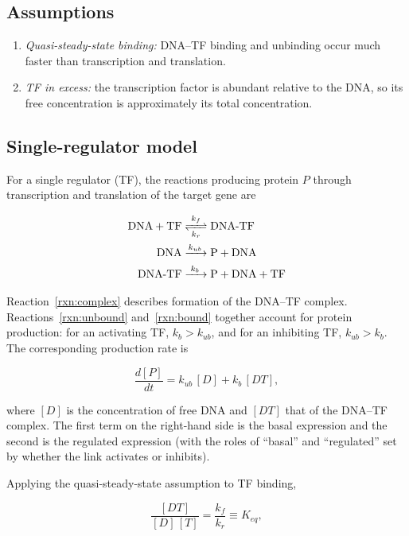 \documentclass[11pt]{article}
\begin{document}
\subsection{Assumptions}

\begin{enumerate}
    \item \emph{Quasi-steady-state binding:} DNA--TF binding and unbinding occur
    much faster than transcription and translation.
    \item \emph{TF in excess:} the transcription factor is abundant relative to
    the DNA, so its free concentration is approximately its total concentration.
\end{enumerate}

\subsection{Single-regulator model}

For a single regulator (TF), the reactions producing protein $P$ through
transcription and translation of the target gene are

\begin{align}
    \ce{DNA + TF &<=>[$k_f$][$k_r$] DNA{-}TF} \label{rxn:complex} \\
    \ce{DNA &->[$k_{ub}$] P + DNA} \label{rxn:unbound} \\
    \ce{DNA{-}TF &->[$k_{b}$] P + DNA + TF} \label{rxn:bound}
\end{align}

Reaction~\eqref{rxn:complex} describes formation of the DNA--TF complex.
Reactions~\eqref{rxn:unbound} and~\eqref{rxn:bound} together account for protein
production: for an activating TF, $k_b > k_{ub}$, and for an inhibiting TF,
$k_{ub} > k_b$. The corresponding production rate is

\begin{equation}
    \frac{d[P]}{dt} = k_{ub}\,[D] + k_{b}\,[DT],
    \label{eq:rate}
\end{equation}

where $[D]$ is the concentration of free DNA and $[DT]$ that of the DNA--TF
complex. The first term on the right-hand side is the basal expression and the
second is the regulated expression (with the roles of ``basal'' and
``regulated'' set by whether the link activates or inhibits).

Applying the quasi-steady-state assumption to TF binding,

\begin{equation}
    \frac{[DT]}{[D]\,[T]} = \frac{k_f}{k_r} \equiv K_{eq},
    \label{eq:qssa}
\end{equation}
\end{document}
